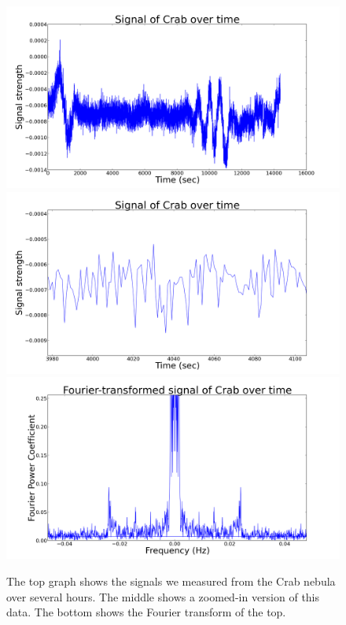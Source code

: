 \documentclass[11pt]{article}
\begin{document}
\begin{figure}
\centering
\includegraphics[scale=0.35]{garphs/crabvolt}
\includegraphics[scale=0.35]{garphs/crabzoom}
\includegraphics[scale=0.35]{garphs/crabfourier}
\caption{The top graph shows the signals we measured from the Crab nebula over several hours. The middle shows a zoomed-in version of this data. The bottom shows the Fourier transform of the top. \label{crab}}
\end{figure}
\end{document}
